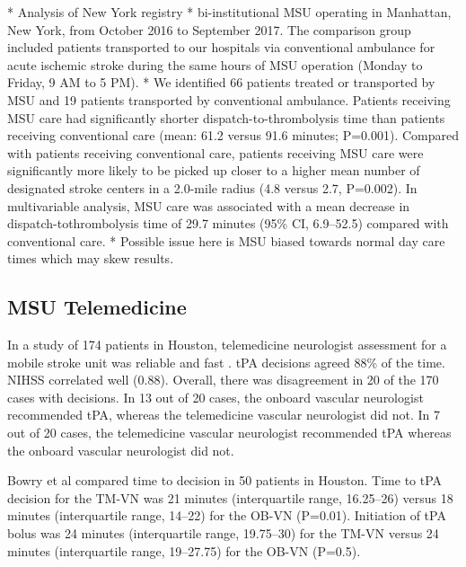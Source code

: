 \begin{markdown}
* Analysis of New York registry
* bi-institutional MSU operating in Manhattan, New York, from October 2016 to September 2017. The comparison group included patients transported to our hospitals via conventional ambulance for acute ischemic stroke during the same hours of MSU operation (Monday to Friday, 9 AM to 5 PM).
* We identified 66 patients treated or transported by MSU and 19 patients transported by conventional ambulance. Patients receiving MSU care had significantly shorter dispatch-to-thrombolysis time than patients receiving conventional care (mean: 61.2 versus 91.6 minutes; P=0.001). Compared with patients receiving conventional care, patients receiving MSU care were significantly more likely to be picked up closer to a higher mean number of designated stroke centers in a 2.0-mile radius (4.8 versus 2.7, P=0.002). In multivariable analysis, MSU care was associated with a mean decrease in dispatch-tothrombolysis time of 29.7 minutes (95\% CI, 6.9–52.5) compared with conventional care.
* Possible issue here is MSU biased towards normal day care times which may skew results.
\end{markdown}

\subsection{MSU Telemedicine}

In a study of 174 patients in Houston, telemedicine neurologist assessment for a mobile stroke unit was reliable and fast \cite{wu_telemedicine_2017} . tPA decisions agreed 88\% of the time. NIHSS correlated well (0.88). Overall, there was disagreement in 20 of the 170 cases with decisions. In 13 out of 20 cases, the onboard vascular neurologist recommended tPA, whereas the telemedicine vascular neurologist did not. In 7 out of 20 cases, the telemedicine vascular neurologist recommended tPA whereas the onboard vascular neurologist did not. 

Bowry et al \cite{bowry_time_2018} compared time to decision in 50 patients in Houston. Time to tPA decision for the TM-VN was 21 minutes (interquartile range, 16.25–26) versus 18 minutes (interquartile range, 14–22) for the OB-VN (P=0.01). Initiation of tPA bolus was 24 minutes (interquartile range, 19.75–30) for the TM-VN versus 24 minutes (interquartile range, 19–27.75) for the OB-VN (P=0.5).

